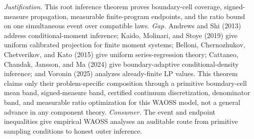 \documentclass{article}
\begin{document}
\par\smallskip\noindent \textit{Justification.} This root inference theorem proves boundary-cell coverage, signed-measure propagation, measurable finite-program endpoints, and the ratio bound on one simultaneous event over compatible laws. \textit{Gap.} Andrews and Shi (2013) address conditional-moment inference; Kaido, Molinari, and Stoye (2019) give uniform calibrated projection for finite moment systems; Belloni, Chernozhukov, Chetverikov, and Kato (2015) give uniform series-regression theory; Cattaneo, Chandak, Jansson, and Ma (2024) give boundary-adaptive conditional-density inference; and Voronin (2025) analyzes already-finite LP values. This theorem claims only their problem-specific composition through a primitive boundary-cell mean band, signed-measure band, certified continuum discretization, denominator band, and measurable ratio optimization for this WAOSS model, not a general advance in any component theory. \textit{Consumer.} The event and endpoint inequalities give empirical WAOSS analyses an auditable route from primitive sampling conditions to honest outer inference.
\end{document}
